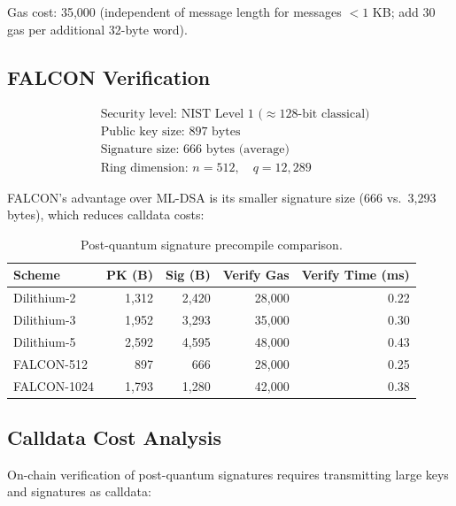 Gas cost: 35,000 (independent of message length for messages $< 1$ KB; add 30 gas per additional 32-byte word).

\subsection{FALCON Verification}

\begin{definition}
\begin{align}
    &\text{Security level: NIST Level 1 ($\approx 128$-bit classical)} \\
    &\text{Public key size: } 897 \text{ bytes} \\
    &\text{Signature size: } 666 \text{ bytes (average)} \\
    &\text{Ring dimension: } n = 512, \quad q = 12{,}289
\end{align}
\end{definition}

FALCON's advantage over ML-DSA is its smaller signature size (666 vs.\ 3,293 bytes), which reduces calldata costs:

\begin{table}[H]
\centering
\caption{Post-quantum signature precompile comparison.}
\label{tab:pq_comparison}
\begin{tabular}{lrrrr}
\toprule
\textbf{Scheme} & \textbf{PK (B)} & \textbf{Sig (B)} & \textbf{Verify Gas} & \textbf{Verify Time (ms)} \\
\midrule
Dilithium-2 & 1,312 & 2,420 & 28,000 & 0.22 \\
Dilithium-3 & 1,952 & 3,293 & 35,000 & 0.30 \\
Dilithium-5 & 2,592 & 4,595 & 48,000 & 0.43 \\
FALCON-512 & 897 & 666 & 28,000 & 0.25 \\
FALCON-1024 & 1,793 & 1,280 & 42,000 & 0.38 \\
\bottomrule
\end{tabular}
\end{table}

\subsection{Calldata Cost Analysis}

On-chain verification of post-quantum signatures requires transmitting large keys and signatures as calldata:

